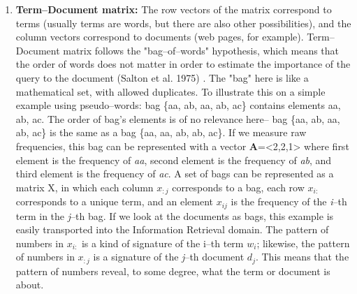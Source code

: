 \begin{enumerate}
\item \textbf{Term--Document matrix:} The row vectors of the matrix correspond to terms (usually 
terms are words, but there are also other possibilities), and the column vectors correspond to 
documents (web pages, for example).  Term--Document matrix follows the "bag--of--words" hypothesis, 
which means that the order of words does not matter in order to estimate the importance of the query 
to the document (Salton et al. 1975) \cite{salton1975}. The "bag" here is like a mathematical set, with 
allowed duplicates.  To illustrate this on a simple example using pseudo--words: bag \{aa, ab, aa, ab, 
ac\} contains elements aa, ab, ac. The order of bag's elements is of no relevance here-- bag \{aa, ab, 
aa, ab, ac\} is the same as a bag \{aa, aa, ab, ab, ac\}. If we measure raw frequencies, this bag can 
be represented with a vector \textbf{A}=<2,2,1> where first element is the frequency of \textit{aa}, 
second element is the frequency of \textit{ab}, and third element is the frequency of \textit{ac}. A set of 
bags can be represented as a matrix X, in which each column $x_{:j}$ corresponds to a bag, each row 
$x_{i:}$ corresponds to a unique term, and an element $x_{ij}$ is the frequency of the \textit{i}--th 
term in the \textit{j}--th bag. If we look at the documents as bags, this example is easily transported into the 
Information Retrieval domain. The pattern of numbers in $x_{i:}$ is a kind of signature of the i--th term 
$w_{i}$; likewise, the pattern of numbers in $x_{:j}$ is a signature of the \textit{j}--th document 
$d_{j}$. This means that the pattern of numbers reveal, to some degree, what the term or document is 
about.


\end{enumerate}
